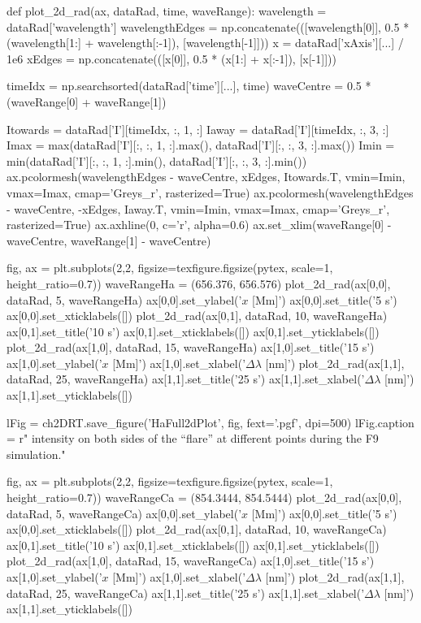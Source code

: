 \begin{pycode}[2DRT]
def plot_2d_rad(ax, dataRad, time, waveRange):
    wavelength = dataRad['wavelength']
    wavelengthEdges = np.concatenate(([wavelength[0]], 0.5 * (wavelength[1:] + wavelength[:-1]), [wavelength[-1]]))
    x = dataRad['xAxis'][...] / 1e6
    xEdges = np.concatenate(([x[0]], 0.5 * (x[1:] + x[:-1]), [x[-1]]))

    timeIdx = np.searchsorted(dataRad['time'][...], time)
    waveCentre = 0.5 * (waveRange[0] + waveRange[1])

    Itowards = dataRad['I'][timeIdx, :, 1, :]
    Iaway = dataRad['I'][timeIdx, :, 3, :]
    Imax = max(dataRad['I'][:, :, 1, :].max(), dataRad['I'][:, :, 3, :].max())
    Imin = min(dataRad['I'][:, :, 1, :].min(), dataRad['I'][:, :, 3, :].min())
    ax.pcolormesh(wavelengthEdges - waveCentre, xEdges, Itowards.T, vmin=Imin, vmax=Imax, cmap='Greys_r', rasterized=True)
    ax.pcolormesh(wavelengthEdges - waveCentre, -xEdges, Iaway.T, vmin=Imin, vmax=Imax, cmap='Greys_r', rasterized=True)
    ax.axhline(0, c='r', alpha=0.6)
    ax.set_xlim(waveRange[0] - waveCentre, waveRange[1] - waveCentre)

fig, ax = plt.subplots(2,2, figsize=texfigure.figsize(pytex, scale=1, height_ratio=0.7))
waveRangeHa = (656.376, 656.576)
plot_2d_rad(ax[0,0], dataRad, 5, waveRangeHa)
ax[0,0].set_ylabel('$x$ [Mm]')
ax[0,0].set_title('5 s')
ax[0,0].set_xticklabels([])
plot_2d_rad(ax[0,1], dataRad, 10, waveRangeHa)
ax[0,1].set_title('10 s')
ax[0,1].set_xticklabels([])
ax[0,1].set_yticklabels([])
plot_2d_rad(ax[1,0], dataRad, 15, waveRangeHa)
ax[1,0].set_title('15 s')
ax[1,0].set_ylabel('$x$ [Mm]')
ax[1,0].set_xlabel('$\Delta\lambda$ [nm]')
plot_2d_rad(ax[1,1], dataRad, 25, waveRangeHa)
ax[1,1].set_title('25 s')
ax[1,1].set_xlabel('$\Delta\lambda$ [nm]')
ax[1,1].set_yticklabels([])

lFig = ch2DRT.save_figure('HaFull2dPlot', fig, fext='.pgf', dpi=500)
lFig.caption = r"\Ha{} intensity on both sides of the ``flare'' at different points during the F9 simulation."

fig, ax = plt.subplots(2,2, figsize=texfigure.figsize(pytex, scale=1, height_ratio=0.7))
waveRangeCa = (854.3444, 854.5444)
plot_2d_rad(ax[0,0], dataRad, 5, waveRangeCa)
ax[0,0].set_ylabel('$x$ [Mm]')
ax[0,0].set_title('5 s')
ax[0,0].set_xticklabels([])
plot_2d_rad(ax[0,1], dataRad, 10, waveRangeCa)
ax[0,1].set_title('10 s')
ax[0,1].set_xticklabels([])
ax[0,1].set_yticklabels([])
plot_2d_rad(ax[1,0], dataRad, 15, waveRangeCa)
ax[1,0].set_title('15 s')
ax[1,0].set_ylabel('$x$ [Mm]')
ax[1,0].set_xlabel('$\Delta\lambda$ [nm]')
plot_2d_rad(ax[1,1], dataRad, 25, waveRangeCa)
ax[1,1].set_title('25 s')
ax[1,1].set_xlabel('$\Delta\lambda$ [nm]')
ax[1,1].set_yticklabels([])


\end{pycode}
